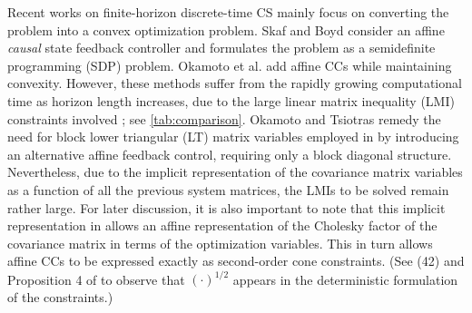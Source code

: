 Recent works on finite-horizon discrete-time CS mainly focus on converting the problem into a convex optimization problem. Skaf and Boyd \cite{skafDesignAffineControllers2010} consider an affine \textit{causal} state feedback controller and formulates the problem as a semidefinite programming (SDP) problem. Okamoto et al. \cite{okamotoOptimalCovarianceControl2018} add affine CCs while maintaining convexity. However, these methods suffer from the rapidly growing computational time as horizon length increases, due to the large linear matrix inequality (LMI) constraints involved \cite{rapakouliasDiscreteTimeOptimalCovariance2023}; see \cref{tab:comparison}. Okamoto and Tsiotras \cite{okamotoOptimalStochasticVehicle2019} remedy the need for block lower triangular (LT) matrix variables employed in \cite{skafDesignAffineControllers2010,okamotoOptimalCovarianceControl2018} by introducing an alternative affine feedback control, requiring only a block diagonal structure. Nevertheless, due to the implicit representation of the covariance matrix variables as a function of all the previous system matrices, the LMIs to be solved remain rather large. For later discussion, it is also important to note that this implicit representation in \cite{skafDesignAffineControllers2010,okamotoOptimalCovarianceControl2018,okamotoOptimalStochasticVehicle2019} allows an affine representation of the Cholesky factor of the covariance matrix in terms of the optimization variables. This in turn allows affine CCs to be expressed exactly as second-order cone constraints. (See (42) and Proposition 4 of \cite{okamotoOptimalCovarianceControl2018} to observe that \((\cdot)^{1/2} \) appears in the deterministic formulation of the constraints.)

